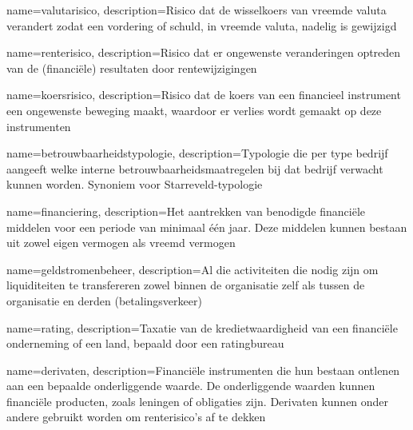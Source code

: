 {
    name=valutarisico,
    description={Risico dat de wisselkoers van vreemde valuta verandert zodat een vordering of schuld, in vreemde valuta, nadelig is gewijzigd}
}

{
    name=renterisico,
    description={Risico dat er ongewenste veranderingen optreden van de (financiële) resultaten door rentewijzigingen}
}

{
    name=koersrisico,
    description={Risico dat de koers van een financieel instrument een ongewenste beweging maakt, waardoor er verlies wordt gemaakt op deze instrumenten}
}

{
    name=betrouwbaarheidstypologie,
    description={Typologie die per type bedrijf aangeeft welke interne betrouwbaarheidsmaatregelen bij dat bedrijf verwacht kunnen worden. Synoniem voor Starreveld-typologie}
}

{
    name=financiering,
    description={Het aantrekken van benodigde financiële middelen voor een periode van minimaal één jaar. Deze middelen kunnen bestaan uit zowel eigen vermogen als vreemd vermogen}
}

{
    name=geldstromenbeheer,
    description={Al die activiteiten die nodig zijn om liquiditeiten te transfereren zowel binnen de organisatie zelf als tussen de organisatie en derden (betalingsverkeer)}
}

{
    name=rating,
    description={Taxatie van de kredietwaardigheid van een financiële onderneming of een land, bepaald door een ratingbureau}
}

{
    name=derivaten,
    description={Financiële instrumenten die hun bestaan ontlenen aan een bepaalde onderliggende waarde. De onderliggende waarden kunnen financiële producten, zoals leningen of obligaties zijn. Derivaten kunnen onder andere gebruikt worden om renterisico’s af te dekken}
}

